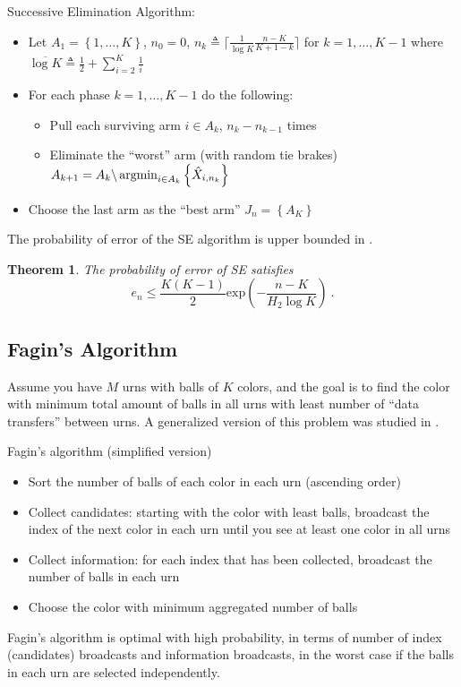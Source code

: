 \documentclass{sig-alternate}
\newcommand{\set}[1]{\left\{#1\right\}}
\newtheorem{thm}{Theorem}
\newcommand{\comment}[1]{}
\newcommand{\paren}[1]{\left( #1 \right)}
\newcommand{\argmin}{\operatornamewithlimits{argmin}}
\begin{document}
Successive Elimination Algorithm:
\begin{itemize}
\item Let $A_1=\set{1,\ldots,K}$, $n_0=0$, $n_k\triangleq\lceil \frac{1}{\overline{\log K}}\frac{n-K}{K+1-k}\rceil$ for $k=1,\ldots,K-1$ where $\overline{\log K}\triangleq \frac{1}{2}+\sum_{i=2}^K\frac{1}{i}$ 
\item For each phase $k=1,\ldots,K-1$ do the following:
\begin{itemize}
\item Pull each surviving arm $i\in A_k$, $n_k-n_{k-1}$ times
\item Eliminate the ``worst'' arm (with random tie brakes) $A_{k+1}=A_k\backslash\argmin_{i\in A_k}\set{\hat{X}_{i,n_k}}$ 
\end{itemize}
\item Choose the last arm as the ``best arm'' $J_n=\set{A_K}$
\end{itemize}
The probability of error of the SE algorithm is upper bounded in \cite{Audibert-Bubeck-Munos-COLT2010}.
\begin{thm}
The probability of error of SE satisfies
\begin{equation}\label{eq: SE error upper bound}
e_n\le \frac{K\paren{K-1}}{2}\mathrm{exp}\paren{-\frac{n-K}{H_2\log K}}\ .
\end{equation} 
\comment{where
$H_2\triangleq \max_{k=1,\ldots,K-1}{\frac{k}{\Delta^2_{(k)}}}$,
and $\Delta_{(k)}$ is the $k$th smallest average gap between the best arm and all other arms}
\end{thm}

\subsection{Fagin's Algorithm}\label{sec: Fagin algo}

Assume you have $M$ urns with balls of $K$ colors, and the goal is to find the color with minimum total amount of balls in all urns with least number of ``data transfers'' between urns. A generalized version of this problem was studied in \cite{Fagin-SIGMOD2002}.

Fagin's algorithm (simplified version)
\begin{itemize}
\item Sort the number of balls of each color in each urn (ascending order)   
\item Collect candidates: starting with the color with least balls, broadcast the index of the next color in each urn until you see at least one color in all urns
\item Collect information: for each index that has been collected, broadcast the number of balls in each urn
\item Choose the color with minimum aggregated number of balls  
\end{itemize}
Fagin's algorithm is optimal with high probability, in terms of number of index (candidates) broadcasts and information broadcasts, in the worst case if the balls in each urn are selected independently.
\end{document}
